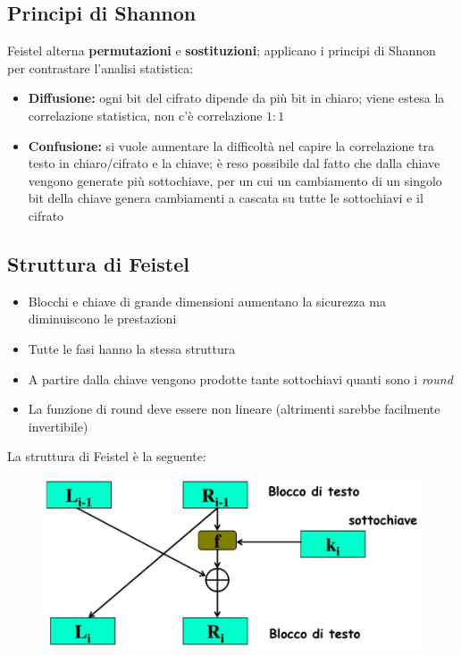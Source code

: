 \subsection{Principi di Shannon}
Feistel alterna \textbf{permutazioni} e \textbf{sostituzioni}; applicano i principi di Shannon 
per contrastare l'analisi statistica:
\begin{itemize}
    \item \textbf{Diffusione:} ogni bit del cifrato dipende da più bit in chiaro; viene estesa la correlazione 
    statistica, non c'è correlazione $1:1$
    \item \textbf{Confusione:} si vuole aumentare la difficoltà nel capire la correlazione tra 
    testo in chiaro/cifrato e la chiave; è reso possibile dal fatto che dalla chiave vengono 
    generate più sottochiave, per un cui un cambiamento di un singolo bit della chiave genera cambiamenti a cascata 
    su tutte le sottochiavi e il cifrato
\end{itemize}

\subsection{Struttura di Feistel}

\begin{itemize}
    \item Blocchi e chiave di grande dimensioni aumentano la sicurezza ma diminuiscono le prestazioni
    \item Tutte le fasi hanno la stessa struttura 
    \item A partire dalla chiave vengono prodotte tante sottochiavi quanti sono i \textit{round}
    \item La funzione di round deve essere non lineare (altrimenti sarebbe facilmente invertibile)
\end{itemize}

\noindent La struttura di Feistel è la seguente:

\begin{figure}[H]
    \centering
    \includegraphics[width=0.8\linewidth]{chapters/chap03/images/feistel.png}
\end{figure}

